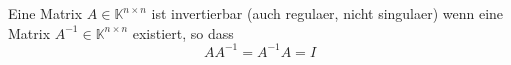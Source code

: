 Eine Matrix $A \in \mathbb{K}^{n \times n}$ ist invertierbar (auch regulaer, nicht singulaer) wenn eine Matrix $A^{-1} \in \mathbb{K}^{n \times n}$ existiert, so dass
$$A A^{-1} = A^{-1} A = I$$
